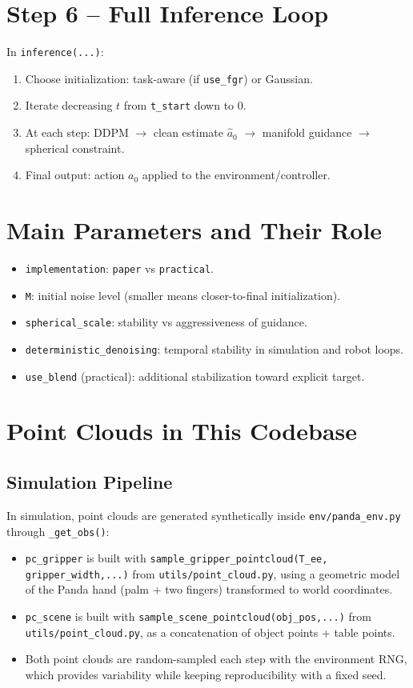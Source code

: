 \documentclass[11pt,a4paper]{article}
\begin{document}
\section{Step 6 -- Full Inference Loop}
In \texttt{inference(...)}:
\begin{enumerate}
\item Choose initialization: task-aware (if \texttt{use\_fgr}) or Gaussian.
\item Iterate decreasing $t$ from \texttt{t\_start} down to $0$.
\item At each step: DDPM $\to$ clean estimate $\hat a_0$ $\to$ manifold guidance $\to$ spherical constraint.
\item Final output: action $a_0$ applied to the environment/controller.
\end{enumerate}

\section{Main Parameters and Their Role}
\begin{itemize}
\item \texttt{implementation}: \texttt{paper} vs \texttt{practical}.
\item \texttt{M}: initial noise level (smaller means closer-to-final initialization).
\item \texttt{spherical\_scale}: stability vs aggressiveness of guidance.
\item \texttt{deterministic\_denoising}: temporal stability in simulation and robot loops.
\item \texttt{use\_blend} (practical): additional stabilization toward explicit target.
\end{itemize}

\section{Point Clouds in This Codebase}
\subsection{Simulation Pipeline}
In simulation, point clouds are generated synthetically inside \texttt{env/panda\_env.py} through \texttt{\_get\_obs()}:
\begin{itemize}
\item \texttt{pc\_gripper} is built with \texttt{sample\_gripper\_pointcloud(T\_ee, gripper\_width,...)} from \texttt{utils/point\_cloud.py}, using a geometric model of the Panda hand (palm + two fingers) transformed to world coordinates.
\item \texttt{pc\_scene} is built with \texttt{sample\_scene\_pointcloud(obj\_pos,...)} from \texttt{utils/point\_cloud.py}, as a concatenation of object points + table points.
\item Both point clouds are random-sampled each step with the environment RNG, which provides variability while keeping reproducibility with a fixed seed.
\end{itemize}
\end{document}
